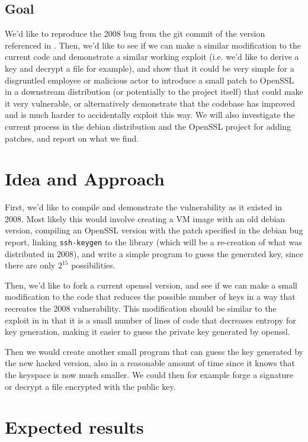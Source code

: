\documentclass[conference]{IEEEtran}
\begin{document}
\subsection{Goal}
We'd like to reproduce the 2008 bug from the git commit of the version
referenced in \cite{2}. Then, we'd like to see if we can make a
similar modification to the current code and demonstrate a similar
working exploit (i.e. we'd like to derive a key and decrypt a file for
example), and show that it could be very simple for a disgruntled
employee or malicious actor to introduce a small patch to OpenSSL in a
downstream distribution (or potentially to the project itself) that
could make it very vulnerable, or alternatively demonstrate that the
codebase has improved and is much harder to accidentally exploit this
way. We will also investigate the current process in the debian
distribution and the OpenSSL project for adding patches, and report on
what we find.

\section{Idea and Approach}

First, we'd like to compile and demonstrate the vulnerability as it
existed in 2008. Most likely this would involve creating a VM image
with an old debian version, compiling an OpenSSL version with the
patch specified in the debian bug report\cite{3}, linking
\verb|ssh-keygen| to the library (which will be a re-creation of what
was distributed in 2008), and write a simple program to guess the
generated key, since there are only $2^{15}$ possibilities.

Then, we'd like to fork a current openssl version, and see if we can
make a small modification to the code that reduces the possible number
of keys in a way that recreates the 2008 vulnerability. This
modification should be similar to the exploit in \cite{1} in that it
is a small number of lines of code that decreases entropy for key
generation, making it easier to guess the private key generated by
openssl.

Then we would create another small program that can guess the key
generated by the new hacked version, also in a reasonable amount of
time since it knows that the keyspace is now much smaller. We could
then for example forge a signature or decrypt a file encrypted with
the public key.


\section{Expected results}
\end{document}
